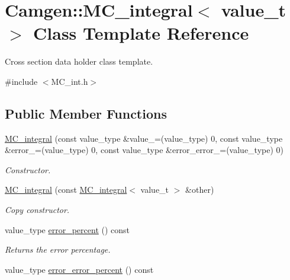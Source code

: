 \hypertarget{a00363}{\section{Camgen\-:\-:M\-C\-\_\-integral$<$ value\-\_\-t $>$ Class Template Reference}
\label{a00363}
}


Cross section data holder class template.  




{\ttfamily \#include $<$M\-C\-\_\-int.\-h$>$}

\subsection*{Public Member Functions}
\begin{DoxyCompactItemize}
\item 
\hypertarget{a00363_a8caa7a907d8e8d240c8c4f40f527b928}{\hyperlink{a00363_a8caa7a907d8e8d240c8c4f40f527b928}{M\-C\-\_\-integral} (const value\-\_\-type \&value\-\_\-=(value\-\_\-type) 0, const value\-\_\-type \&error\-\_\-=(value\-\_\-type) 0, const value\-\_\-type \&error\-\_\-error\-\_\-=(value\-\_\-type) 0)}\label{a00363_a8caa7a907d8e8d240c8c4f40f527b928}

\begin{DoxyCompactList}\small\item\em Constructor. \end{DoxyCompactList}\item 
\hypertarget{a00363_a514bc02671485104c893c760148316f9}{\hyperlink{a00363_a514bc02671485104c893c760148316f9}{M\-C\-\_\-integral} (const \hyperlink{a00363}{M\-C\-\_\-integral}$<$ value\-\_\-t $>$ \&other)}\label{a00363_a514bc02671485104c893c760148316f9}

\begin{DoxyCompactList}\small\item\em Copy constructor. \end{DoxyCompactList}\item 
\hypertarget{a00363_aa506af585c07d90efaf668433222640b}{value\-\_\-type \hyperlink{a00363_aa506af585c07d90efaf668433222640b}{error\-\_\-percent} () const }\label{a00363_aa506af585c07d90efaf668433222640b}

\begin{DoxyCompactList}\small\item\em Returns the error percentage. \end{DoxyCompactList}\item 
\hypertarget{a00363_a9c6b3b3e2be84b597431b9a36a3c37c6}{value\-\_\-type \hyperlink{a00363_a9c6b3b3e2be84b597431b9a36a3c37c6}{error\-\_\-error\-\_\-percent} () const }\label{a00363_a9c6b3b3e2be84b597431b9a36a3c37c6}


\end{DoxyCompactItemize}
